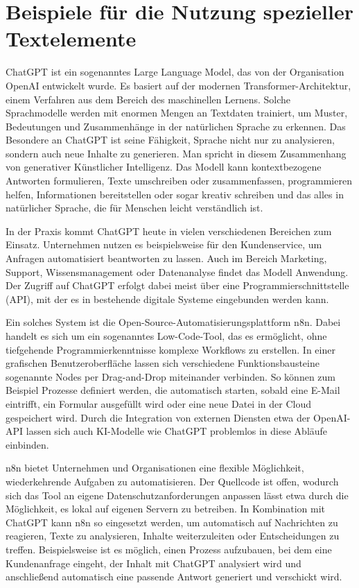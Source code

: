 \documentclass[utf8,biblatex]{bremerhaven_lni}
\begin{document}
\blindtext

\section{Beispiele für die Nutzung spezieller Textelemente}
ChatGPT ist ein sogenanntes Large Language Model, das von der Organisation OpenAI entwickelt wurde. Es basiert auf der modernen Transformer-Architektur, einem Verfahren aus dem Bereich des maschinellen Lernens. Solche Sprachmodelle werden mit enormen Mengen an Textdaten trainiert, um Muster, Bedeutungen und Zusammenhänge in der natürlichen Sprache zu erkennen. Das Besondere an ChatGPT ist seine Fähigkeit, Sprache nicht nur zu analysieren, sondern auch neue Inhalte zu generieren. Man spricht in diesem Zusammenhang von generativer Künstlicher Intelligenz. Das Modell kann kontextbezogene Antworten formulieren, Texte umschreiben oder zusammenfassen, programmieren helfen, Informationen bereitstellen oder sogar kreativ schreiben und das alles in natürlicher Sprache, die für Menschen leicht verständlich ist.

In der Praxis kommt ChatGPT heute in vielen verschiedenen Bereichen zum Einsatz. Unternehmen nutzen es beispielsweise für den Kundenservice, um Anfragen automatisiert beantworten zu lassen. Auch im Bereich Marketing, Support, Wissensmanagement oder Datenanalyse findet das Modell Anwendung. Der Zugriff auf ChatGPT erfolgt dabei meist über eine Programmierschnittstelle (API), mit der es in bestehende digitale Systeme eingebunden werden kann.

Ein solches System ist die Open-Source-Automatisierungsplattform n8n. Dabei handelt es sich um ein sogenanntes Low-Code-Tool, das es ermöglicht, ohne tiefgehende Programmierkenntnisse komplexe Workflows zu erstellen. In einer grafischen Benutzeroberfläche lassen sich verschiedene Funktionsbausteine sogenannte Nodes per Drag-and-Drop miteinander verbinden. So können zum Beispiel Prozesse definiert werden, die automatisch starten, sobald eine E-Mail eintrifft, ein Formular ausgefüllt wird oder eine neue Datei in der Cloud gespeichert wird. Durch die Integration von externen Diensten etwa der OpenAI-API lassen sich auch KI-Modelle wie ChatGPT problemlos in diese Abläufe einbinden.

n8n bietet Unternehmen und Organisationen eine flexible Möglichkeit, wiederkehrende Aufgaben zu automatisieren. Der Quellcode ist offen, wodurch sich das Tool an eigene Datenschutzanforderungen anpassen lässt etwa durch die Möglichkeit, es lokal auf eigenen Servern zu betreiben. In Kombination mit ChatGPT kann n8n so eingesetzt werden, um automatisch auf Nachrichten zu reagieren, Texte zu analysieren, Inhalte weiterzuleiten oder Entscheidungen zu treffen. Beispielsweise ist es möglich, einen Prozess aufzubauen, bei dem eine Kundenanfrage eingeht, der Inhalt mit ChatGPT analysiert wird und anschließend automatisch eine passende Antwort generiert und verschickt wird.
\end{document}
